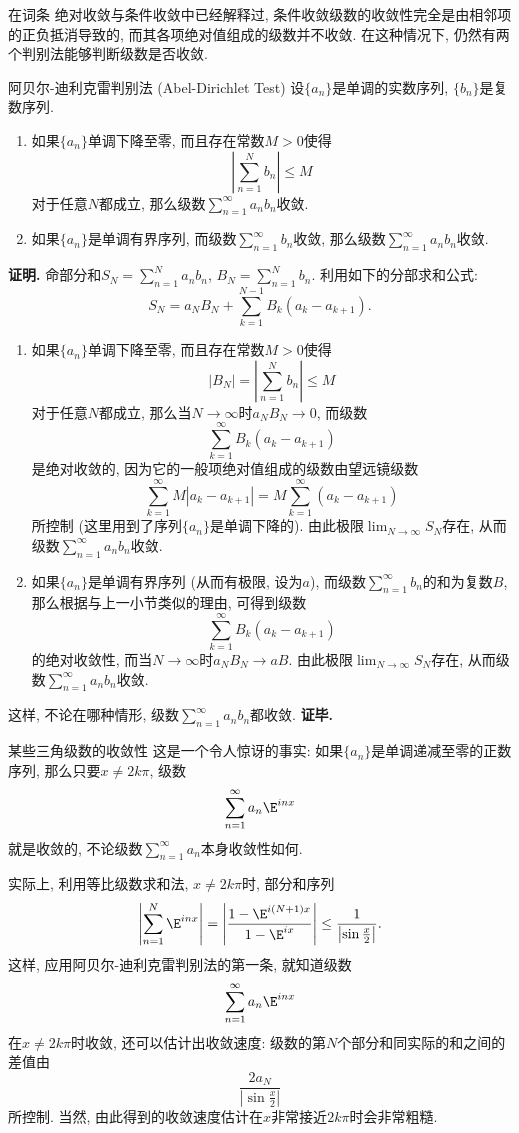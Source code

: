 

在词条 绝对收敛与条件收敛中已经解释过, 条件收敛级数的收敛性完全是由相邻项的正负抵消导致的, 而其各项绝对值组成的级数并不收敛. 在这种情况下, 仍然有两个判别法能够判断级数是否收敛.

\begin{theorem}{阿贝尔-迪利克雷判别法 (Abel-Dirichlet Test)}
设$\{a_n\}$是单调的实数序列, $\{b_n\}$是复数序列.

\begin{enumerate}
\item 如果$\{a_n\}$单调下降至零, 而且存在常数$M>0$使得
$$
\left|\sum_{n=1}^N b_n\right|\leq M
$$
对于任意$N$都成立, 那么级数$\sum_{n=1}^\infty a_nb_n$收敛.

\item 如果$\{a_n\}$是单调有界序列, 而级数$\sum_{n=1}^\infty b_n$收敛, 那么级数$\sum_{n=1}^\infty a_nb_n$收敛.
\end{enumerate}
\end{theorem}

\textbf{证明.} 命部分和$S_N=\sum_{n=1}^N a_nb_n$, $B_N=\sum_{n=1}^N b_n$. 利用如下的分部求和公式:
$$
S_N=a_NB_N+\sum_{k=1}^{N-1}B_k(a_{k}-a_{k+1}).
$$

\begin{enumerate}
\item 如果$\{a_n\}$单调下降至零, 而且存在常数$M>0$使得
$$
|B_N|=\left|\sum_{n=1}^N b_n\right|\leq M
$$
对于任意$N$都成立, 那么当$N\to\infty$时$a_NB_N\to0$, 而级数
$$
\sum_{k=1}^{\infty}B_k(a_{k}-a_{k+1})
$$
是绝对收敛的, 因为它的一般项绝对值组成的级数由望远镜级数
$$
\sum_{k=1}^{\infty}M|a_{k}-a_{k+1}|
=M\sum_{k=1}^{\infty}(a_{k}-a_{k+1})
$$
所控制 (这里用到了序列$\{a_n\}$是单调下降的). 由此极限$\lim_{N\to\infty}S_N$存在, 从而级数$\sum_{n=1}^\infty a_nb_n$收敛.

\item 如果$\{a_n\}$是单调有界序列 (从而有极限, 设为$a$), 而级数$\sum_{n=1}^\infty b_n$的和为复数$B$, 那么根据与上一小节类似的理由, 可得到级数
$$
\sum_{k=1}^{\infty}B_k(a_{k}-a_{k+1})
$$
的绝对收敛性, 而当$N\to\infty$时$a_NB_N\to aB$. 由此极限$\lim_{N\to\infty}S_N$存在, 从而级数$\sum_{n=1}^\infty a_nb_n$收敛.
\end{enumerate}
这样, 不论在哪种情形, 级数$\sum_{n=1}^\infty a_nb_n$都收敛. \textbf{证毕.}

\begin{example}{某些三角级数的收敛性}
这是一个令人惊讶的事实: 如果$\{a_n\}$是单调递减至零的正数序列, 那么只要$x\neq 2k\pi$, 级数
$$
\sum_{n=1}^\infty a_n \E^{inx}
$$
就是收敛的, 不论级数$\sum_{n=1}^\infty a_n$本身收敛性如何.

实际上, 利用等比级数求和法, $x\neq 2k\pi$时, 部分和序列
$$
\left|\sum_{n=1}^N\E^{inx}\right|
=\left|\frac{1-\E^{i(N+1)x}}{1-\E^{ix}}\right|
\leq\frac{1}{\left|\sin\frac{x}{2}\right|}.
$$
这样, 应用阿贝尔-迪利克雷判别法的第一条, 就知道级数
$$
\sum_{n=1}^\infty a_n \E^{inx}
$$
在$x\neq 2k\pi$时收敛, 还可以估计出收敛速度: 级数的第$N$个部分和同实际的和之间的差值由
$$
\frac{2a_N}{\left|\sin\frac{x}{2}\right|}
$$
所控制. 当然, 由此得到的收敛速度估计在$x$非常接近$2k\pi$时会非常粗糙.
\end{example}